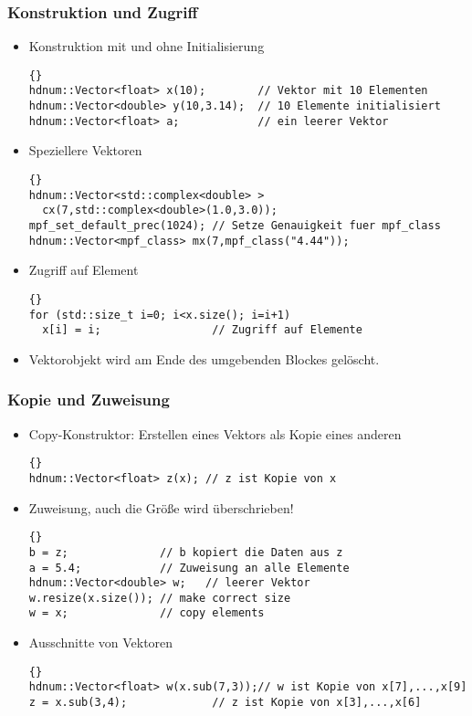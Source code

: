 \documentclass[a4paper,11pt]{article}
\theoremstyle{definition}
\begin{document}
\begin{frame}[fragile]
\frametitle{Konstruktion und Zugriff}
\begin{itemize}
\item Konstruktion mit und ohne Initialisierung\\
{\footnotesize{\begin{lstlisting}{}
hdnum::Vector<float> x(10);        // Vektor mit 10 Elementen
hdnum::Vector<double> y(10,3.14);  // 10 Elemente initialisiert
hdnum::Vector<float> a;            // ein leerer Vektor
\end{lstlisting}}}
\item Speziellere Vektoren\\
{\footnotesize{\begin{lstlisting}{}
hdnum::Vector<std::complex<double> >
  cx(7,std::complex<double>(1.0,3.0));
mpf_set_default_prec(1024); // Setze Genauigkeit fuer mpf_class
hdnum::Vector<mpf_class> mx(7,mpf_class("4.44"));
\end{lstlisting}}}
\item Zugriff auf Element\\
{\footnotesize{\begin{lstlisting}{}
for (std::size_t i=0; i<x.size(); i=i+1)
  x[i] = i;                 // Zugriff auf Elemente
\end{lstlisting}}}
\item Vektorobjekt wird am Ende des umgebenden Blockes gelöscht.
\end{itemize}
\end{frame}

\begin{frame}[fragile]
\frametitle{Kopie und Zuweisung}
\begin{itemize}
\item Copy-Konstruktor: Erstellen eines Vektors als Kopie eines anderen
{\footnotesize{\begin{lstlisting}{}
hdnum::Vector<float> z(x); // z ist Kopie von x
\end{lstlisting}}}
\item Zuweisung, auch die Größe wird überschrieben!
{\footnotesize{\begin{lstlisting}{}
b = z;              // b kopiert die Daten aus z
a = 5.4;            // Zuweisung an alle Elemente
hdnum::Vector<double> w;   // leerer Vektor
w.resize(x.size()); // make correct size
w = x;              // copy elements
\end{lstlisting}}}
\item Ausschnitte von Vektoren\\
{\footnotesize{\begin{lstlisting}{}
hdnum::Vector<float> w(x.sub(7,3));// w ist Kopie von x[7],...,x[9]
z = x.sub(3,4);             // z ist Kopie von x[3],...,x[6]
\end{lstlisting}}}
\end{itemize}
\end{frame}
\end{document}

